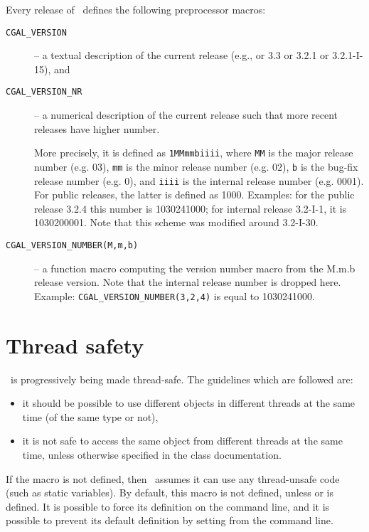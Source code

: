 Every release of \cgal\ defines the following preprocessor macros:
\begin{description}
\item[\texttt{CGAL\_VERSION}]
     -- a textual description of the current release
        (e.g., or 3.3 or 3.2.1 or 3.2.1-I-15), and 
\item[\texttt{CGAL\_VERSION\_NR}]
     -- a numerical description of the current release such that
        more recent releases have higher number.

     More precisely, it is defined as \texttt{1MMmmbiiii},
     where \texttt{MM} is the major release number (e.g. 03),
     \texttt{mm} is the minor release number (e.g. 02),
     \texttt{b} is the bug-fix release number (e.g. 0), and
     \texttt{iiii} is the internal release number (e.g. 0001). For
     public releases, the latter is defined as 1000.
     Examples: for the public release 3.2.4 this number is 
     1030241000; for internal release 3.2-I-1, it is 1030200001.
     Note that this scheme was modified around 3.2-I-30.
\item[\texttt{CGAL\_VERSION\_NUMBER(M,m,b)}]
     -- a function macro computing the version number macro
     from the M.m.b release version.  Note that the internal release
     number is dropped here.  Example: \texttt{CGAL\_VERSION\_NUMBER(3,2,4)}
     is equal to 1030241000.
\end{description}
 

\section{Thread safety}

\cgal\ is progressively being made thread-safe.  The guidelines which are followed
are:
\begin{itemize}
\item it should be possible to use different objects in different threads at
the same time (of the same type or not),
\item it is not safe to access the same object from different threads
at the same time, unless otherwise specified in the class documentation.
\end{itemize}

If the macro  is not defined, then \cgal\ assumes it can use
any thread-unsafe code (such as static variables).  By default, this macro is not
defined, unless  or  is defined.  It is possible
to force its definition on the command line, and it is possible to prevent its default
definition by setting  from the command line.


